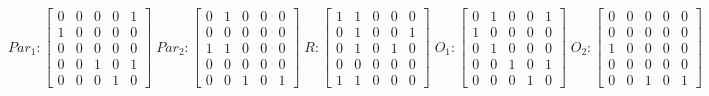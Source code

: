      $$
        Par_{1} : \begin{bmatrix}
            0 & 0 & 0 & 0 & 1 \\
            1 & 0 & 0 & 0 & 0 \\
            0 & 0 & 0 & 0 & 0 \\
			0 & 0 & 1 & 0 & 1 \\
            0 & 0 & 0 & 1 & 0 
        \end{bmatrix}
        \;
        Par_{2} : \begin{bmatrix}
            0 & 1 & 0 & 0 & 0 \\
            0 & 0 & 0 & 0 & 0 \\
            1 & 1 & 0 & 0 & 0 \\
            0 & 0 & 0 & 0 & 0 \\
            0 & 0 & 1 & 0 & 1
        \end{bmatrix}
        \;
        R : \begin{bmatrix}
            1 & 1 & 0 & 0 & 0 \\
            0 & 1 & 0 & 0 & 1 \\
            0 & 1 & 0 & 1 & 0 \\
            0 & 0 & 0 & 0 & 0 \\
            1 & 1 & 0 & 0 & 0
        \end{bmatrix}
        \;
        O_{1} : \begin{bmatrix}
            0 & 1 & 0 & 0 & 1 \\
            1 & 0 & 0 & 0 & 0 \\
            0 & 1 & 0 & 0 & 0 \\
            0 & 0 & 1 & 0 & 1 \\
            0 & 0 & 0 & 1 & 0
        \end{bmatrix}
        \;
        O_{2} : \begin{bmatrix}
            0 & 0 & 0 & 0 & 0 \\
            0 & 0 & 0 & 0 & 0 \\
            1 & 0 & 0 & 0 & 0 \\
            0 & 0 & 0 & 0 & 0 \\
            0 & 0 & 1 & 0 & 1
        \end{bmatrix}
    $$ 
